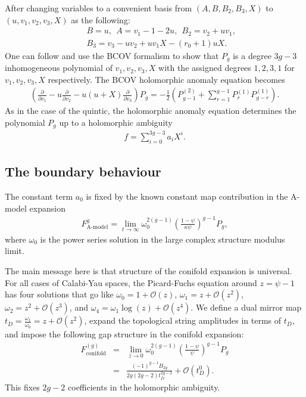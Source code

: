 \documentclass[12pt]{article}
\begin{document}
After changing variables to a convenient basis from
$(A,B,B_2,B_3,X)$ to $(u,v_1,v_2,v_3,X)$ as the following:
\begin{eqnarray}
&&B=u,~~A=v_1-1-2u,~~B_2=v_2+uv_1, \nonumber \\ &&
B_3=v_3-uv_2+uv_1X-(r_0+1)u X. \nonumber
\end{eqnarray}
One can follow \cite{Yamaguchi} and use the BCOV formalism to show
that $P_g$ is a degree $3g-3$ inhomogeneous polynomial of
$v_1,v_2,v_3, X$ with the assigned degrees $1,2,3,1$ for $v_1,
v_2, v_3, X$ respectively. The BCOV holomorphic anomaly equation
becomes
\begin{eqnarray}
(\frac{\partial}{\partial{v_1}}-u\frac{\partial }{\partial
{v_2}}-u(u+X)\frac{\partial}{\partial{v_3}})P_g
=-\frac{1}{2}(P^{(2)}_{g-1}+\sum_{r=1}^{g-1}P^{(1)}_rP^{(1)}_{g-r}).
\end{eqnarray}
As in the case of the quintic, the holomorphic anomaly equation
determines the polynomial $P_g$ up to a holomorphic ambiguity
\begin{eqnarray}
f=\sum_{i=0}^{3g-3} a_iX^i.
\end{eqnarray}

\subsection{The boundary behaviour}
The constant term $a_0$ is fixed by the known constant map
contribution in the A-model expansion
\begin{eqnarray}
F^{g}_{\textrm{A-model}}=\lim _{t\rightarrow \infty}
\omega_0^{2(g-1)}(\frac{1-\psi}{\kappa \psi})^{g-1}P_g,
\end{eqnarray}
where $\omega_0$ is the power series solution in the large complex
structure modulus limit.

The main message here is that structure of the conifold expansion
is universal. For all cases of Calabi-Yau spaces, the Picard-Fuchs
equation around $z=\psi-1$ has four solutions that go like
$\omega_0= 1+\mathcal{O}(z)$, $\omega_1= z+\mathcal{O}(z^2)$,
$\omega_2=z^2+\mathcal{O}(z^3)$, and
$\omega_4=\omega_1\log(z)+\mathcal{O}(z^4)$. We define a dual
mirror map $t_D=\frac{\omega_1}{\omega_0}=z+\mathcal{O}(z^2)$,
expand the topological string amplitudes in terms of $t_D$, and
impose the following gap structure in the conifold expansion:
\begin{eqnarray}
F^{(g)}_{\textrm{conifold}} &=& \lim_{\bar{z}\rightarrow
0}\omega_0^{2(g-1)}(\frac{1-\psi}{\psi})^{g-1}P_g \nonumber \\
&=&
\frac{(-1)^{g-1}B_{2g}}{2g(2g-2)t_D^{2g-2}}+\mathcal{O}(t_D^0).
\end{eqnarray}
This fixes $2g-2$ coefficients in the holomorphic ambiguity.
\end{document}

